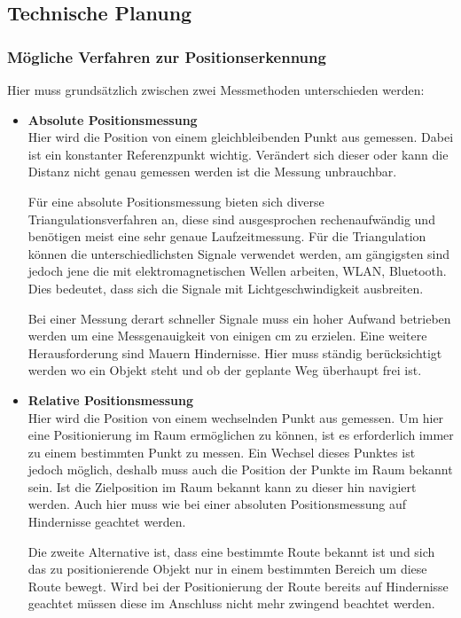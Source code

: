   \subsection{Technische Planung}
    \subsubsection{Mögliche Verfahren zur Positionserkennung}
    Hier muss grundsätzlich zwischen zwei Messmethoden unterschieden werden:
    \begin{itemize}
      \item \textbf{Absolute Positionsmessung}\\
      Hier wird die Position von einem gleichbleibenden Punkt aus gemessen. Dabei ist ein konstanter Referenzpunkt wichtig.
      Verändert sich dieser oder kann die Distanz nicht genau gemessen werden ist die Messung unbrauchbar.

      Für eine absolute Positionsmessung bieten sich diverse Triangulationsverfahren an,
      diese sind ausgesprochen rechenaufwändig und benötigen meist eine sehr genaue Laufzeitmessung.
      Für die Triangulation können die unterschiedlichsten Signale verwendet werden, am gängigsten sind jedoch jene die mit elektromagnetischen Wellen arbeiten,
      \zB WLAN, Bluetooth. Dies bedeutet, dass sich die Signale mit Lichtgeschwindigkeit ausbreiten.

      Bei einer Messung derart schneller Signale muss ein hoher Aufwand betrieben werden um eine Messgenauigkeit von einigen cm zu erzielen.
      Eine weitere Herausforderung sind Mauern \bzw Hindernisse. Hier muss ständig berücksichtigt werden wo ein Objekt steht und ob der geplante Weg überhaupt frei ist.
      \item \textbf{Relative Positionsmessung}\\
      Hier wird die Position von einem wechselnden Punkt aus gemessen. Um hier eine Positionierung im Raum ermöglichen zu können,
      ist es erforderlich immer zu einem bestimmten Punkt zu messen. Ein Wechsel dieses Punktes ist jedoch möglich,
      deshalb muss auch die Position der Punkte im Raum bekannt sein. Ist die Zielposition im Raum bekannt kann zu dieser hin navigiert werden.
      Auch hier muss wie bei einer absoluten Positionsmessung auf Hindernisse geachtet werden.

      Die zweite Alternative ist, dass eine bestimmte Route bekannt ist und sich das zu positionierende Objekt nur in einem bestimmten Bereich um diese Route bewegt.
      Wird bei der Positionierung der Route bereits auf Hindernisse geachtet müssen diese im Anschluss nicht mehr zwingend beachtet werden.
    \end{itemize}

